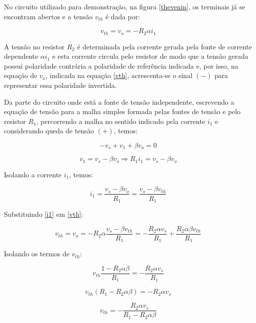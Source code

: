 \documentclass[12pt,fleqn]{book} %
\begin{document}
\begin{example}

No circuito utilizado para demonstração, na figura \ref{thevenin}, os terminais já se encontram abertos e a tensão $v_{th}$ é dada por:

\begin{equation}\label{vth}
v_{th} = v_o = -R_2 \alpha i_1
\end{equation}

A tensão no resistor $R_2$ é determinada pela corrente gerada pela fonte de corrente dependente $\alpha i_1$ e esta corrente circula pelo resistor de modo que a tensão gerada possui polaridade contrária a polaridade de referência indicada e, por isso, na equação de $v_o$, indicada na equação \ref{vth}, acrescenta-se o sinal $(-)$ para representar essa polaridade invertida.

Da parte do circuito onde está a fonte de tensão independente, escrevendo a equação de tensão para a malha simples formada pelas fontes de tensão e pelo resistor $R_1$, percorrendo a malha no sentido indicado pela corrente $i_1$ e considerando queda de tensão $(+)$, temos:

\begin{equation}
-v_s+v_1+\beta v_o=0
\end{equation}

\begin{equation}
v_1=v_s-\beta v_o \Rightarrow R_1 i_1=v_s-\beta v_o
\end{equation}

Isolando a corrente $i_1$, temos:

\begin{equation}\label{i1}
i_1=\frac{v_s-\beta v_o}{R_1} = \frac{v_s-\beta v_{th}}{R_1}
\end{equation}

Substituindo \ref{i1} em \ref{vth}:

\begin{equation}
v_{th}=v_o=-R_2\alpha\frac{v_s-\beta v_{th}}{R_1}=-\frac{R_2\alpha v_s}{R_1}+\frac{R_2 \alpha\beta v_{th}}{R_1}
\end{equation}

Isolando os termos de $v_{th}$:

\begin{equation}
v_{th}\frac{1-R_2 \alpha\beta}{R_1} =-\frac{R_2\alpha v_s}{R_1} 
\end{equation}

\begin{equation}
v_{th}(R_1-R_2 \alpha\beta)=-R_2\alpha v_s
\end{equation}

\begin{equation}
v_{th}=-\frac{R_2\alpha v_s}{R_1-R_2\alpha\beta}
\end{equation}

\end{example}
\end{document}
